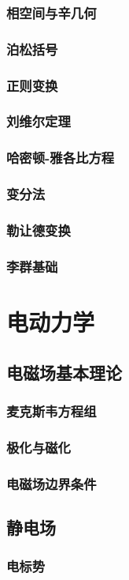\documentclass[a4paper]{report}
\begin{document}
\section{相空间与辛几何}
\section{泊松括号}
\section{正则变换}
\section{刘维尔定理}
\section{哈密顿-雅各比方程}
\appendix
\section{变分法}
\section{勒让德变换}
\section{李群基础}


\part{电动力学}
\chapter{电磁场基本理论}
\section{麦克斯韦方程组}
\section{极化与磁化}
\section{电磁场边界条件}
\chapter{静电场}
\section{电标势}
\end{document}

